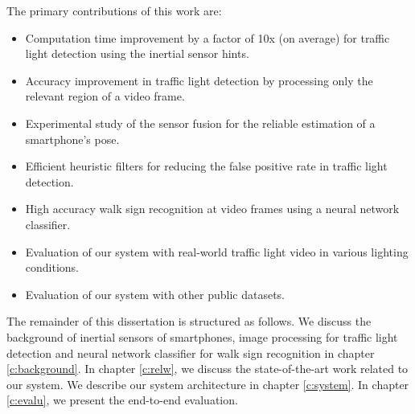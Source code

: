 The primary contributions of this work are:

\begin{itemize}
\item Computation time improvement by a factor of 10x (on average) for traffic light detection using the inertial sensor hints. 
\item Accuracy improvement in traffic light detection by processing only the relevant region of a video frame. 
\item Experimental study of the sensor fusion for the reliable estimation of a smartphone's pose. 
\item Efficient heuristic filters for reducing the false positive rate in traffic light detection.
\item High accuracy walk sign recognition at video frames using a neural network classifier.
\item Evaluation of our system with real-world traffic light video in various lighting conditions. 
\item Evaluation of our system with other public datasets.
  

\end{itemize}

The remainder of this dissertation is structured as follows.
We discuss the background of inertial sensors of smartphones, image processing for traffic light detection and neural network classifier for walk sign recognition in chapter \ref{c:background}.
In chapter \ref{c:relw}, we discuss the state-of-the-art work related to our system.
We describe our system architecture in chapter \ref{c:system}.
In chapter \ref{c:evalu}, we present the end-to-end evaluation.
